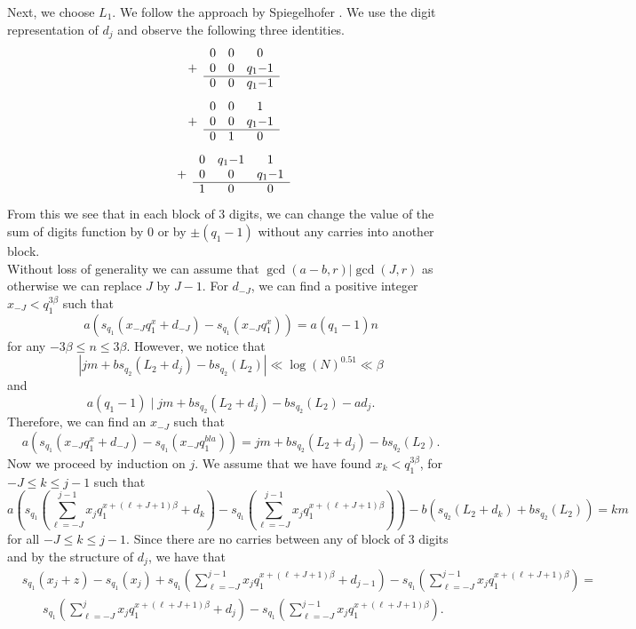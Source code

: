 \documentclass[12pt]{amsart}
\renewcommand{\leq}{\leqslant}
\theoremstyle{definition}
\numberwithin{equation}{section}
\numberwithin{equation}{section}
\begin{document}
Next, we choose $L_1$. We follow the approach by Spiegelhofer \cite{Spiegelhofer2023a}. We use the digit representation of $d_j$ and observe the following three identities.
\[
\begin{array}{cccc}
	&0&0&0\\
	+&0&0&\mathrel{{q_1}{-}{1}}\\
	\cline{2-4}
	&0&0&\mathrel{{q_1}{-}{1}}
\end{array}
\]
\[
\begin{array}{cccc}
	&0&0&1\\
	+&0&0&\mathrel{{q_1}{-}{1}}\\
	\cline{2-4}
	&0&1&0
\end{array}
\]
\[
\begin{array}{cccc}
	&0&\mathrel{{q_1}{-}{1}}&1\\
	+&0&0&\mathrel{{q_1}{-}{1}}\\
	\cline{2-4}
	&1&0&0
\end{array}
\]
From this we see that in each block of $3$ digits, we can change the value of the sum of digits function by $0$ or by $\pm (\mathrel{{q_1}{-}{1}})$ without any carries into another block.\\
Without loss of generality we can assume that $\gcd(a-b,r)|\gcd(J,r)$ as otherwise we can replace $J$ by $J-1$. For $d_{-J}$, we can find a positive integer $x_{-J}<q_1^{3\beta}$ such that
\[
	a(s_{q_1}(x_{-J}q_1^{x}+d_{-J})-s_{q_1}(x_{-J}q_1^{x}))=a(q_1-1)n
\]
for any $-3\beta\leq n \leq 3\beta$. However, we notice that
\[
	|jm + bs_{q_2}(L_2+d_j)-bs_{q_2}(L_2)| \ll \log(N)^{0.51}\ll \beta
\]
and
\[
	a(q_1-1)\mid jm + bs_{q_2}(L_2+d_j)-bs_{q_2}(L_2) - ad_j.
\]
Therefore, we can find an $x_{-J}$ such that
\[
	a(s_{q_1}(x_{-J}q_1^{x}+d_{-J})-s_{q_1}(x_{-J}q_1^{bla})) = jm + bs_{q_2}(L_2+d_j)-bs_{q_2}(L_2).
\]
Now we proceed by induction on $j$. We assume that we have found $x_{k}<q_1^{3\beta}$, for $-J\leq k\leq j-1$ such that
\[
	a\left(s_{q_1}\left(\sum_{\ell = -J}^{j-1}x_{j}q_1^{x+(\ell+J+1)\beta}+d_{k}\right)-s_{q_1}\left(\sum_{\ell = -J}^{j-1}x_{j}q_1^{x+(\ell+J+1)\beta}\right)\right) - b (s_{q_2}(L_2+d_k) + bs_{q_2}(L_2)) = km
\]
for all $-J\leq k\leq j-1$. Since there are no carries between any of block of $3$ digits and by the structure of $d_j$, we have that
\begin{align*}
	&s_{q_1}(x_j+z)-s_{q_1}(x_j) + s_{q_1}\left(\sum_{\ell = -J}^{j-1}x_{j}q_1^{x+(\ell+J+1)\beta}+d_{j-1}\right)-s_{q_1}\left(\sum_{\ell = -J}^{j-1}x_{j}q_1^{x+(\ell+J+1)\beta}\right) =\\
	&\hspace{20pt}
	s_{q_1}\left(\sum_{\ell = -J}^{j}x_{j}q_1^{x+(\ell+J+1)\beta}+d_{j}\right)-s_{q_1}\left(\sum_{\ell = -J}^{j-1}x_{j}q_1^{x+(\ell+J+1)\beta}\right).
\end{align*}
\end{document}
